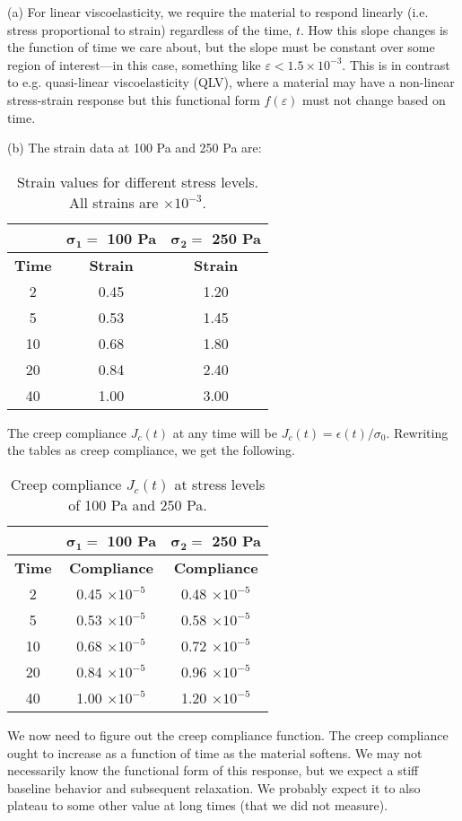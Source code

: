 (a) For linear viscoelasticity, we require the material to respond linearly (i.e. stress proportional to strain) regardless of the time, $t$. 
How this slope changes is the function of time we care about, but the slope must be constant over some region of interest---in this case, something like $\varepsilon<1.5\times10^{-3}$. 
This is in contrast to e.g. quasi-linear viscoelasticity (QLV), where a material may have a non-linear stress-strain response but this functional form $f(\varepsilon)$ must not change based on time. 

(b) The strain data at 100 Pa and 250 Pa are:
\begin{table}[h]
    \caption{Strain values for different stress levels. All strains are $\times 10^{-3}$.}
    \centering
\begin{tabular}{c c c}
     & \textbf{$\bm{\sigma_1=}$ 100 Pa}  & \textbf{$\bm{\sigma_2=}$ 250 Pa}\\ \hline
      \textbf{Time} & \textbf{Strain}  & \textbf{Strain}\\ \hline
    2 & 0.45 & 1.20\\
    5 & 0.53 & 1.45\\
    10 & 0.68 & 1.80\\
    20 & 0.84 & 2.40\\
    40 & 1.00 & 3.00
\end{tabular}
\end{table}

The creep compliance $J_c(t)$ at any time will be $J_c(t) = \epsilon(t)/\sigma_0$. 
Rewriting the tables as creep compliance, we get the following.
\begin{table}[H]
    \caption{Creep compliance $J_c(t)$ at stress levels of 100 Pa and 250 Pa.}
    \centering
\begin{tabular}{c c c}
    & \textbf{$\bm{\sigma_1=}$ 100 Pa}  & \textbf{$\bm{\sigma_2=}$ 250 Pa}\\ \hline
   \textbf{Time} & \textbf{Compliance}  & \textbf{Compliance}\\ \hline
    2 & 0.45 $\times 10^{-5}$ & 0.48 $\times 10^{-5}$\\
    5 & 0.53 $\times 10^{-5}$ & 0.58 $\times 10^{-5}$\\
    10 & 0.68 $\times 10^{-5}$ & 0.72 $\times 10^{-5}$\\
    20 & 0.84 $\times 10^{-5}$ & 0.96 $\times 10^{-5}$\\
    40 & 1.00 $\times 10^{-5}$ & 1.20 $\times 10^{-5}$
\end{tabular}
\end{table}
We now need to figure out the creep compliance function. 
The creep compliance ought to increase as a function of time as the material softens. 
We may not necessarily know the functional form of this response, but we expect a stiff baseline behavior and subsequent relaxation. 
We probably expect it to also plateau to some other value at long times (that we did not measure). 

